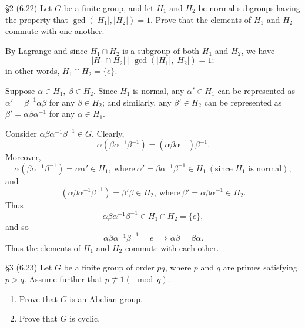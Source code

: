 \documentclass{homework}
\begin{document}
\begin{problem}{\S 2}
  (6.22) Let $G$ be a finite group, and let $H_1$ and $H_2$ be normal subgroups having the property
  that $\gcd{(\left| H_1 \right|, \left| H_2 \right|  )}=1$. Prove that the elements of $H_1$ and
  $H_2$ commute with one another. 
\end{problem}
\begin{solution}
  By Lagrange and since $H_1\cap H_2$ is a subgroup of both $H_1$ and $H_2$, we have \[
    \left| H_1\cap H_2 \right| \mid \gcd{(\left| H_1 \right|,\left| H_2 \right|  )}=1
  ;\] in other words, $H_1\cap H_2=\{ e \}$.

  Suppose $\alpha\in H_1,\ \beta\in H_2$. Since $H_1$ is normal, any $\alpha'\in H_1$ can be
  represented as $\alpha'=\beta^{-1}\alpha\beta$ for any $\beta\in H_2$; and similarly, any
  $\beta'\in H_2$ can be represented as $\beta'=\alpha\beta\alpha^{-1}$ for any $\alpha\in H_1$.

  Consider $\alpha\beta\alpha^{-1}\beta^{-1}\in G$. Clearly, \[
    \alpha(\beta\alpha^{-1}\beta^{-1})=(\alpha\beta\alpha^{-1})\beta^{-1}.
  \] Moreover, \[
  \alpha(\beta\alpha^{-1}\beta^{-1})=\alpha\alpha'\in H_1,
    ~\text{where}~\alpha'=\beta\alpha^{-1}\beta^{-1}\in H_1~(\text{since $H_1$ is normal})
  ,\] and \[
    (\alpha\beta\alpha^{-1}\beta^{-1})=\beta'\beta\in
    H_2,~\text{where}~\beta'=\alpha\beta\alpha^{-1}\in H_2
  .\] Thus \[
    \alpha\beta\alpha^{-1}\beta^{-1}\in H_1\cap H_2=\{ e \}
  ,\] and so \[
    \alpha\beta\alpha^{-1}\beta^{-1}=e \implies \alpha\beta=\beta\alpha
  .\] Thus the elements of $H_1$ and $H_2$ commute with each other.
\end{solution}

\begin{problem}{\S 3}
  (6.23) Let $G$ be a finite group of order $pq$, where $p$ and $q$ are primes satisfying $p>q$.
  Assume further that $p\not\equiv 1(\mod{q})$.
  \begin{enumerate}[label=(\alph*)]
    \item Prove that $G$ is an Abelian group.
    \item Prove that $G$ is cyclic.
  \end{enumerate}
\end{problem}
\end{document}
